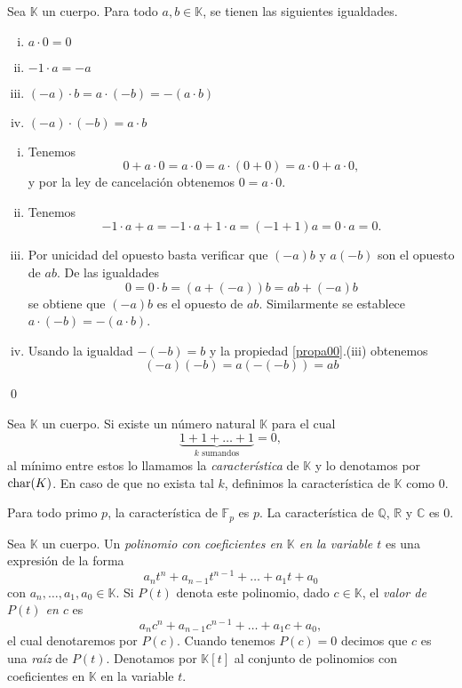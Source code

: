 \begin{prop}\label{propa00}
Sea $\mathbb{K}$ un cuerpo. Para todo $a,b\in \mathbb{K}$, se tienen las siguientes igualdades.
\begin{enumerate}[(i)]
\item $a\cdot 0=0$
\item $-1\cdot a=-a$
\item $(-a)\cdot b=a\cdot(-b)=-(a\cdot b)$
\item $(-a)\cdot (-b)=a\cdot b$
\end{enumerate}
\end{prop}

\dem
\begin{enumerate}[(i)]
\item Tenemos
\[
0+a\cdot 0=a\cdot 0=a\cdot (0+0)=a\cdot 0+ a\cdot 0,
\]
y por la ley de cancelación obtenemos $0=a\cdot 0$.
\item Tenemos
\[
-1\cdot a+a=-1\cdot a+1\cdot a=(-1+1)a=0\cdot a=0.
\]
\item Por unicidad del opuesto basta verificar que $(-a)b$ y $a(-b)$ son el opuesto de $ab$. De las igualdades
\[
0=0\cdot b=\left( a+(-a)\right) b=ab+(-a)b
\]
se obtiene que $(-a)b$ es el opuesto de $ab$. Similarmente se establece $a\cdot(-b)=-(a\cdot b)$.
\item Usando la igualdad $-(-b)=b$ y la propiedad \ref{propa00}.(iii) obtenemos
\[
(-a)(-b)=a\left(-(-b)\right) =ab
\]
\end{enumerate}
\qed

\begin{defn}
Sea $\mathbb{K}$ un cuerpo. Si existe un número natural $\mathbb{K}$ para el cual
\[
\underbrace{1+1+\ldots+1}_{k \textrm{ sumandos}}=0,
\]
al mínimo entre estos lo llamamos la \emph{característica} de $\mathbb{K}$ y lo denotamos por $\operatorname{char}(K)$. En caso de que no exista tal $k$, definimos la característica de $\mathbb{K}$ como $0$.   
\end{defn}

\begin{obs}
Para todo primo $p$, la característica de $\mathbb{F}_p$ es $p$. La característica de $\mathbb{Q}$, $\mathbb{R}$ y $\mathbb{C}$ es $0$.
\end{obs}

\begin{defn}\label{defpoly}
Sea $\mathbb{K}$ un cuerpo. Un \emph{polinomio con coeficientes en $\mathbb{K}$ en la variable $t$} es una expresión de la forma
$$a_nt^n+a_{n-1}t^{n-1}+\ldots+a_1t+a_0$$
con $a_n,\ldots,a_1,a_0\in\mathbb{K}$. Si $P(t)$ denota este polinomio, dado $c\in \mathbb{K}$, el \emph{valor de $P(t)$ en $c$} es
$$a_nc^n+a_{n-1}c^{n-1}+\ldots+a_1c+a_0,$$
el cual denotaremos por $P(c)$. Cuando tenemos $P(c)=0$ decimos que $c$ es una \emph{raíz} de $P(t)$. Denotamos por $\mathbb{K}[t]$ al conjunto de polinomios con coeficientes en $\mathbb{K}$ en la variable $t$.
\end{defn}

